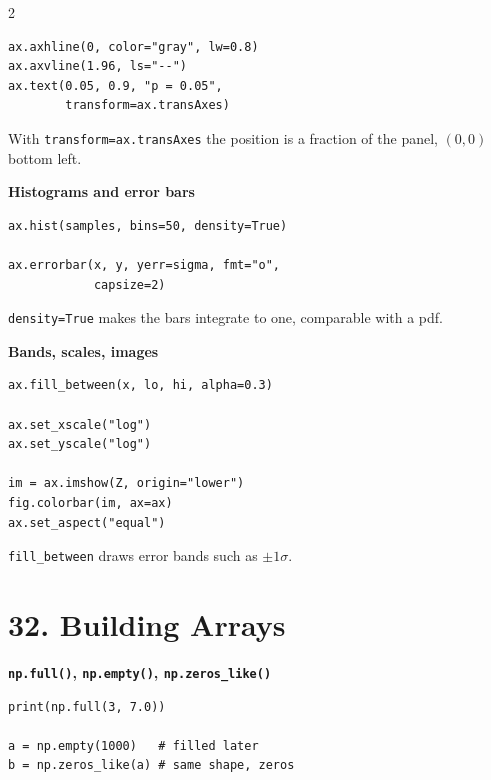\documentclass[10pt,a4paper]{article}
\begin{document}
\begin{multicols}{2}
\begin{card}
\begin{lstlisting}[style=pythonstyle]
ax.axhline(0, color="gray", lw=0.8)
ax.axvline(1.96, ls="--")
ax.text(0.05, 0.9, "p = 0.05",
        transform=ax.transAxes)
\end{lstlisting}

With \texttt{transform=ax.transAxes} the position is a fraction of the
panel, $(0,0)$ bottom left.
\end{card}

\begin{card}
\textbf{Histograms and error bars}

\begin{lstlisting}[style=pythonstyle]
ax.hist(samples, bins=50, density=True)

ax.errorbar(x, y, yerr=sigma, fmt="o",
            capsize=2)
\end{lstlisting}

\texttt{density=True} makes the bars integrate to one, comparable with a pdf.
\end{card}

\begin{card}
\textbf{Bands, scales, images}

\begin{lstlisting}[style=pythonstyle]
ax.fill_between(x, lo, hi, alpha=0.3)

ax.set_xscale("log")
ax.set_yscale("log")

im = ax.imshow(Z, origin="lower")
fig.colorbar(im, ax=ax)
ax.set_aspect("equal")
\end{lstlisting}

\texttt{fill\_between} draws error bands such as $\pm1\sigma$.
\end{card}

\section*{32. Building Arrays}

\begin{card}
\textbf{\texttt{np.full()}, \texttt{np.empty()}, \texttt{np.zeros\_like()}}

\begin{lstlisting}[style=pythonstyle]
print(np.full(3, 7.0))

a = np.empty(1000)   # filled later
b = np.zeros_like(a) # same shape, zeros
\end{lstlisting}


\end{card}
\end{multicols}
\end{document}
